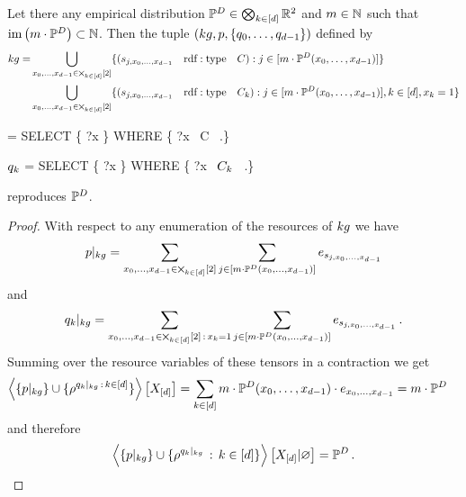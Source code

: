 \begin{theorem}
	Let there any empirical distribution $\mathbb{P}^{D}\in\bigotimes_{k\in[d]}\mathbb{R}^2$ and $m\in\mathbb{N}$ such that $\mathrm{im}\left(m\cdot\mathbb{P}^{D}\right)\subset\mathbb{N}$.
	Then the tuple $(kg,p,\{q_{0},\ldots,q_{d-1}\})$ defined by
	\begin{align}
		kg =
		& \bigcup_{{x_{0},\ldots,x_{d-1}}\in\bigtimes_{k\in[d]}[2]}  \{(
			s_{j, {x_{0},\ldots,x_{d-1}}} \quad \mathrm{rdf:type} \quad C ) : j \in [m\cdot\mathbb{P}^{D}({x_{0},\ldots,x_{d-1}})] \}  \\
		&\bigcup_{{x_{0},\ldots,x_{d-1}}\in\bigtimes_{k\in[d]}[2]}  \{(
			s_{j, {x_{0},\ldots,x_{d-1}}} \quad \mathrm{rdf:type} \quad C_k
		) :  j \in [m\cdot\mathbb{P}^{D}({x_{0},\ldots,x_{d-1}})], k\in[d] , x_{k}=1\} 
	\end{align}
	\begin{centeredcode}
		\impformula = SELECT \{ ?x \} WHERE \{ ?x \quad \rdftype \quad C \, .\}
	\end{centeredcode}
	\begin{centeredcode}
		$q_{k}$ = SELECT \{ ?x \} WHERE \{ ?x \quad \rdftype \quad $C_k$ \, .\}
	\end{centeredcode}
	reproduces $\mathbb{P}^{D}$.
\end{theorem}
\begin{proof}
	With respect to any enumeration of the resources of $kg$ we have
	\begin{align}
		{p}|_{kg} 
		= \sum_{{x_{0},\ldots,x_{d-1}}\in\bigtimes_{k\in[d]}[2]} \sum_{j \in [m\cdot\mathbb{P}^{D}({x_{0},\ldots,x_{d-1}})]} e_{s_{j, {x_{0},\ldots,x_{d-1}}} } 
	\end{align}
	and
	\begin{align}
		{q_{k}}|_{kg} 
		= \sum_{{x_{0},\ldots,x_{d-1}}\in\bigtimes_{k\in[d]}[2] \, : \, x_{k} = 1} \sum_{j \in [m\cdot\mathbb{P}^{D}({x_{0},\ldots,x_{d-1}})]} e_{s_{j, {x_{0},\ldots,x_{d-1}}} } \, . 
	\end{align}
	Summing over the resource variables of these tensors in a contraction we get
	\begin{align}
		\left\langle \{{p}|_{kg}\}\cup\{\rho^{{q_{k}}|_{kg}\, : \, k\in[d]}\}\right\rangle \left[ X_{[d]} \right]
		& = \sum_{k\in[d]}  m\cdot\mathbb{P}^{D}({x_{0},\ldots,x_{d-1}}) \cdot e_{{x_{0},\ldots,x_{d-1}}} = m \cdot \mathbb{P}^{D} 
	\end{align}
	and therefore
	\begin{align}
		\left\langle \{{p}|_{kg}\}\cup\{\rho^{{q_{k}}|_{kg}}\, : \, k\in[d]\}\right\rangle \left[ X_{[d]} | \varnothing \right] = \mathbb{P}^{D} \, . 
	\end{align}
\end{proof}

